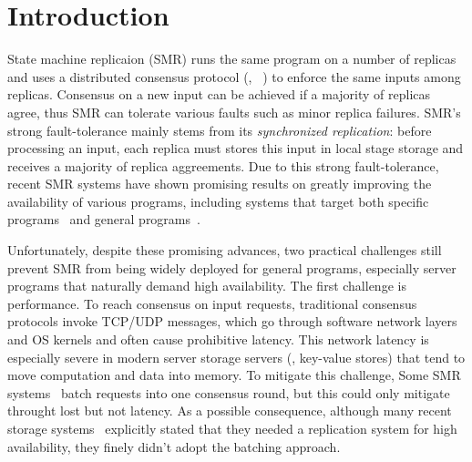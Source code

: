 \section{Introduction} \label{sec:intro}

State machine replicaion (SMR) runs the same program on a 
number of replicas and uses a distributed consensus protocol (\eg, 
\paxos~\cite{crane:sosp15}) to enforce the same inputs among 
replicas. Consensus on a new input can be achieved if a majority of 
replicas agree, thus SMR can tolerate various faults such as minor replica 
failures. SMR's strong fault-tolerance mainly stems from its 
\emph{synchronized replication}: before processing an input, each replica must 
stores this input in local stage storage and receives a majority of replica 
aggreements. Due to this strong fault-tolerance, recent SMR systems have shown 
promising results on greatly improving the availability of various programs, 
including systems that target both specific programs~\cite{chubby:osdi, 
zookeeper} and general programs~\cite{crane:sosp15,eve:osdi12,rex:eurosys14}.

Unfortunately, despite these promising advances, two practical challenges still 
prevent SMR from being widely deployed for general programs, especially 
server programs that naturally demand high availability. The first challenge is 
performance. To reach consensus on input requests, traditional consensus 
protocols invoke TCP/UDP messages, which go through software network layers 
and OS kernels and often cause prohibitive latency. This network latency is 
especially severe in modern server storage servers (\eg, key-value stores) that 
tend to move computation and data into memory. To mitigate this challenge, Some 
SMR systems~\cite{calvin:sigmod12,rex:eusorys14} batch requests into one 
consensus round, but this could only mitigate throught lost but not latency. As 
a possible consequence, although many recent storage systems~\cite{drtm} 
explicitly stated that they needed a replication system for high availability, 
they finely didn't adopt the batching approach.

